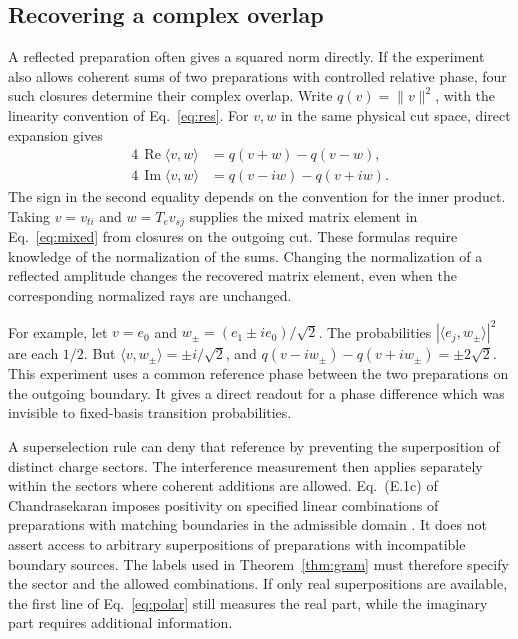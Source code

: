 \documentclass[11pt,letterpaper]{article}
\begin{document}
\subsection{Recovering a complex overlap}
A reflected preparation often gives a squared norm directly. If the
experiment also allows coherent sums of two preparations with controlled
relative phase, four such closures determine their complex overlap.
Write \(q(v)=\|v\|^2\), with the linearity convention of
Eq.~\eqref{eq:res}. For \(v,w\) in the same physical cut space, direct
expansion gives
\begin{align}
 4\,\operatorname{Re}\langle v,w\rangle
   &=q(v+w)-q(v-w),\\
 4\,\operatorname{Im}\langle v,w\rangle
   &=q(v-iw)-q(v+iw).
 \label{eq:polar}
\end{align}
The sign in the second equality depends on the convention for the inner
product. Taking \(v=v_{ti}\) and \(w=T_e v_{sj}\) supplies the mixed
matrix element in Eq.~\eqref{eq:mixed} from closures on the outgoing
cut. These formulas require knowledge of the normalization of the sums.
Changing the normalization of a reflected amplitude changes the recovered
matrix element, even when the corresponding normalized rays are unchanged.

For example, let \(v=e_0\) and
\(w_\pm=(e_1\pm i e_0)/\sqrt2\). The probabilities
\(|\langle e_j,w_\pm\rangle|^2\) are each \(1/2\). But
\(\langle v,w_\pm\rangle=\pm i/\sqrt2\), and
\(q(v-iw_\pm)-q(v+iw_\pm)=\pm2\sqrt2\).
This experiment uses a common reference phase between the two
preparations on the outgoing boundary. It gives a direct readout for a
phase difference which was invisible to fixed-basis transition
probabilities.

A superselection rule can deny that reference by preventing the
superposition of distinct charge sectors. The interference measurement
then applies separately within the sectors where coherent additions are
allowed. Eq.~(E.1c) of Chandrasekaran imposes positivity on specified
linear combinations of preparations with matching boundaries in the
admissible domain \cite{nc}. It does not assert access to arbitrary
superpositions of preparations with incompatible boundary sources.
The labels used in Theorem~\ref{thm:gram} must therefore specify the
sector and the allowed combinations. If only real superpositions are
available, the first line of Eq.~\eqref{eq:polar} still measures the real
part, while the imaginary part requires additional information.
\end{document}
